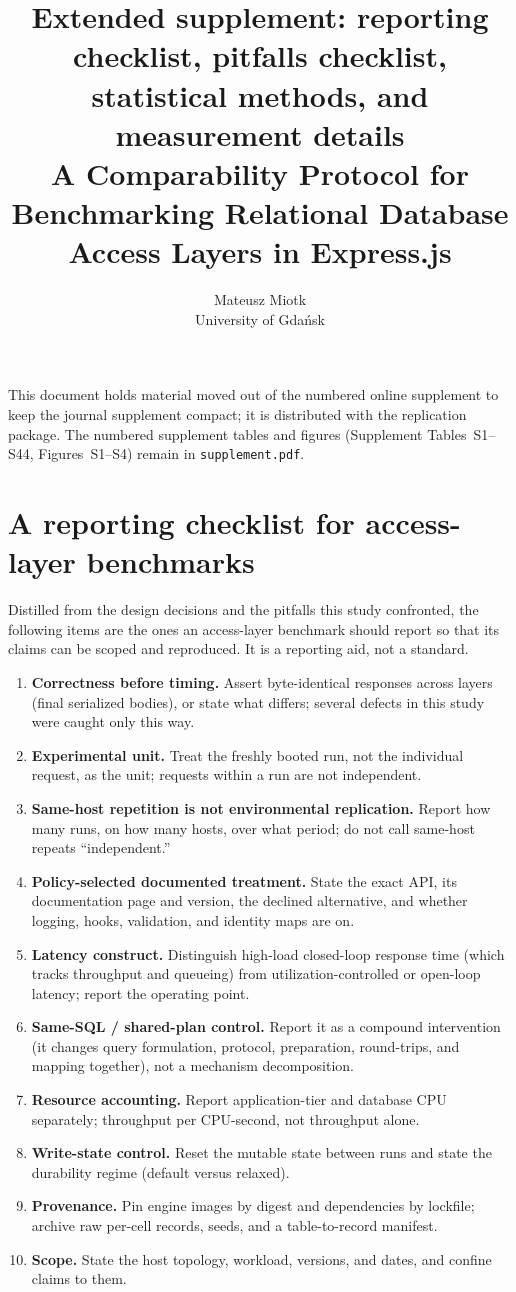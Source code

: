 \documentclass[11pt,a4paper]{article}
\title{Extended supplement: reporting checklist, pitfalls checklist,\\
  statistical methods, and measurement details\\[2pt]
  \large A Comparability Protocol for Benchmarking Relational Database Access Layers in Express.js}
\author{Mateusz Miotk\\ University of Gda\'nsk}
\date{}
\begin{document}
\maketitle
\noindent This document holds material moved out of the numbered online supplement to keep the
journal supplement compact; it is distributed with the replication package. The numbered supplement
tables and figures (Supplement Tables~S1--S44, Figures~S1--S4) remain in \texttt{supplement.pdf}.

\section{A reporting checklist for access-layer benchmarks}
\label{sup:checklist}
Distilled from the design decisions and the pitfalls this study confronted, the
following items are the ones an access-layer benchmark should report so that its
claims can be scoped and reproduced. It is a reporting aid, not a standard.
\begin{enumerate}
  \item \textbf{Correctness before timing.} Assert byte-identical responses across
        layers (final serialized bodies), or state what differs; several defects in
        this study were caught only this way.
  \item \textbf{Experimental unit.} Treat the freshly booted run, not the individual
        request, as the unit; requests within a run are not independent.
  \item \textbf{Same-host repetition is not environmental replication.} Report how
        many runs, on how many hosts, over what period; do not call same-host
        repeats ``independent.''
  \item \textbf{Policy-selected documented treatment.} State the exact API, its documentation page and
        version, the declined alternative, and whether logging, hooks, validation,
        and identity maps are on.
  \item \textbf{Latency construct.} Distinguish high-load closed-loop response time
        (which tracks throughput and queueing) from utilization-controlled or
        open-loop latency; report the operating point.
  \item \textbf{Same-SQL / shared-plan control.} Report it as a compound intervention
        (it changes query formulation, protocol, preparation, round-trips, and
        mapping together), not a mechanism decomposition.
  \item \textbf{Resource accounting.} Report application-tier and database CPU
        separately; throughput per CPU-second, not throughput alone.
  \item \textbf{Write-state control.} Reset the mutable state between runs and state
        the durability regime (default versus relaxed).
  \item \textbf{Provenance.} Pin engine images by digest and dependencies by
        lockfile; archive raw per-cell records, seeds, and a table-to-record manifest.
  \item \textbf{Scope.} State the host topology, workload, versions, and dates, and
        confine claims to them.
\end{enumerate}
\end{document}
